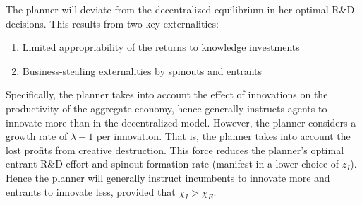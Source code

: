 \documentclass[11pt,english]{article}
\theoremstyle{remark}
\begin{document}
The planner will deviate from the decentralized equilibrium in her optimal R\&D decisions. This results from two key externalities: 
\begin{enumerate}
	\item Limited appropriability of the returns to knowledge investments
	\item Business-stealing externalities by spinouts and entrants
\end{enumerate}

Specifically, the planner takes into account the effect of innovations on the productivity of the aggregate economy, hence generally instructs agents to innovate more than in the decentralized model. However, the planner considers a growth rate of $\lambda - 1$ per innovation. That is, the planner takes into account the lost profits from creative destruction. This force reduces the planner's optimal entrant R\&D effort and spinout formation rate (manifest in a lower choice of $z_I$). Hence the planner will generally instruct incumbents to innovate more and entrants to innovate less, provided that $\chi_I > \chi_E$. 
\end{document}
